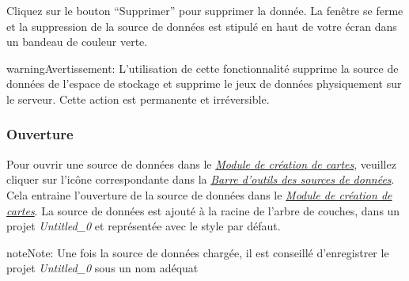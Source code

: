 \documentclass[letterpaper,10pt,french]{sphinxmanual}
\begin{document}
Cliquez sur le bouton ``Supprimer'' pour supprimer la donnée. La fenêtre se ferme et la suppression de la source de données est stipulé en haut de votre écran dans un bandeau de couleur verte.

\begin{notice}{warning}{Avertissement:}
L'utilisation de cette fonctionnalité supprime la source de données de l'espace de stockage et supprime le jeux de données physiquement sur le serveur. Cette action est permanente et irréversible.
\end{notice}


\subsubsection{Ouverture}
\label{data/datasources:ouverture}
Pour ouvrir une source de données dans le {\hyperref[maps/index::doc]{\emph{\emph{Module de création de cartes}}}}, veuillez cliquer sur l'icône correspondante dans la {\hyperref[data/datasources:datasource-table-label]{\emph{Barre d'outils des sources de données}}}. Cela entraine l'ouverture de la source de données dans le {\hyperref[maps/index::doc]{\emph{\emph{Module de création de cartes}}}}. La source de données est ajouté à la racine de l'arbre de couches, dans un projet \emph{Untitled\_0} et représentée avec le style par défaut.

\begin{notice}{note}{Note:}
Une fois la source de données chargée, il est conseillé d'enregistrer le projet \emph{Untitled\_0} sous un nom adéquat
\end{notice}
\end{document}
